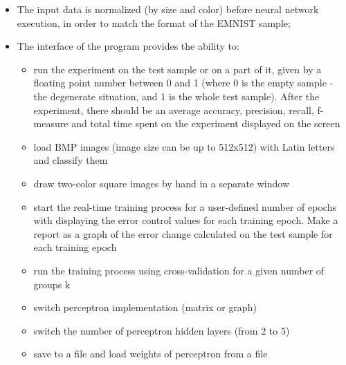 \documentclass{article}
\begin{document}
\begin{itemize}
    \item The input data is normalized (by size and color) before neural network execution,
    in order to match the format of the EMNIST sample;
    \item The interface of the program provides the ability to:
      \begin{itemize}
          \item  run the experiment on the test sample or on a part of it, given by a floating point number between 0 and 1 (where 0 is the empty sample - the degenerate situation, and 1 is the whole test sample). After the experiment, there should be an average accuracy, precision, recall, f-measure and total time spent on the experiment displayed on the screen
          \item load BMP images (image size can be up to 512x512) with Latin letters and classify them
          \item draw two-color square images by hand in a separate window
          \item start the real-time training process for a user-defined number of epochs with displaying the error control values for each training epoch. Make a report as a graph of the error change calculated on the test sample for each training epoch
          \item run the training process using cross-validation for a given number of groups k
          \item switch perceptron implementation (matrix or graph)
          \item switch the number of perceptron hidden layers (from 2 to 5)
          \item save to a file and load weights of perceptron from a file
    \end{itemize}
\end{itemize}
\end{document}
